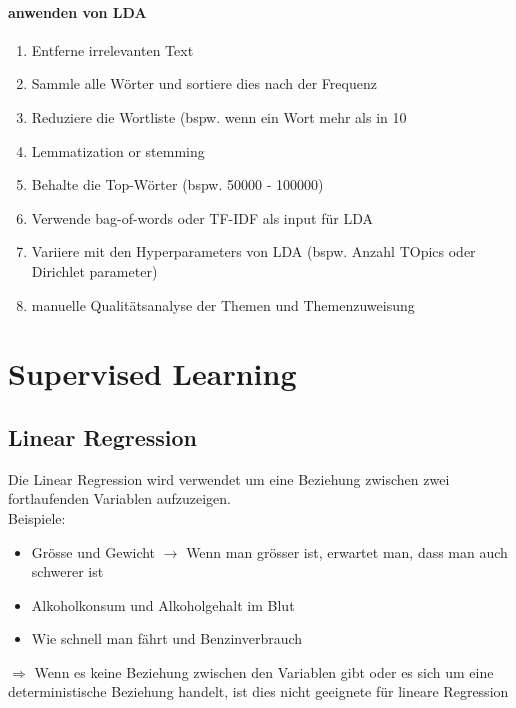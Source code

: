 \documentclass{article}
\theoremstyle{merke}
\theoremstyle{definition}
\begin{document}
                    \subsubsection{anwenden von LDA}
            \begin{enumerate}
                \item Entferne irrelevanten Text
                \item Sammle alle Wörter und sortiere dies nach der Frequenz
                \item Reduziere die Wortliste (bspw. wenn ein Wort mehr als in 10%
                \item Lemmatization or stemming
                \item Behalte die Top-Wörter (bspw. 50000 - 100000)
                \item Verwende bag-of-words oder TF-IDF als input für LDA
                \item Variiere mit den Hyperparameters von LDA (bspw. Anzahl TOpics oder Dirichlet parameter)
                \item manuelle Qualitätsanalyse der Themen und Themenzuweisung
            \end{enumerate}

\chapter{Supervised Learning}

    \section{Linear Regression}
    Die Linear Regression wird verwendet um eine Beziehung zwischen zwei fortlaufenden Variablen aufzuzeigen.\\
    Beispiele:
    \begin{itemize}
        \item Grösse und Gewicht $\rightarrow$ Wenn man grösser ist, erwartet man, dass man auch schwerer ist
        \item Alkoholkonsum und Alkoholgehalt im Blut 
        \item Wie schnell man fährt und Benzinverbrauch
    \end{itemize}
    $\Rightarrow$ Wenn es keine Beziehung zwischen den Variablen gibt oder es sich um eine deterministische Beziehung handelt, ist dies nicht geeignete für lineare Regression
\end{document}
